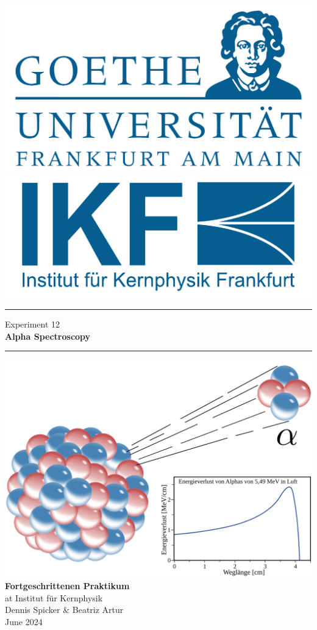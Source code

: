 \documentclass{scrartcl}
\begin{document}
	
\begin{titlepage}
	\newcommand{\HRule}{\rule{\textwidth}{0.5mm}}
	\begin{center}
		{\includegraphics[width=0.3\linewidth]{img/GU-Logo-blau-CMYK} \hfill
			\includegraphics[width=0.3\linewidth]{img/IKF_Logo} \\ }
		\vspace{1cm}
		\HRule
		\vspace{0.4cm}
		{\huge Experiment 12} \\
		\vspace{0.5cm}
		{\huge {\bfseries Alpha Spectroscopy}} \\
		\vspace{0.2cm}
		\HRule
		\vfill
		\includegraphics[width=14cm]{img/front_cover.png}
		\vfill
		{\Large\bfseries Fortgeschrittenen Praktikum} \\
		\vspace{0.3cm}
		{\Large at Institut für Kernphysik} \\
		\vspace{1.5cm}
		{\small 
			Dennis Spicker \& Beatriz Artur \\
			June 2024
		}
	\end{center} 
	\thispagestyle{empty}
	\clearpage
\end{titlepage}
%
\setcounter{tocdepth}{2}
\tableofcontents
\clearpage
\end{document}

